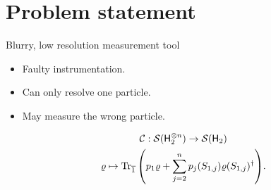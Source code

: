 \section{Problem statement}

\begin{frame}{Blurry, low resolution measurement tool}
    \begin{itemize}
        \item Faulty instrumentation.
        \item Can only resolve one particle.
        \item May measure the wrong particle.
    \end{itemize}
    \begin{gather}\label{eq:CG}
        \mathcal{C}:\mathcal{S}( {\sf H}_{2}^{\otimes n})\to \mathcal{S}({\sf H}_{2})\nonumber\\
        \varrho\mapsto\Tr_{\overline{1}}\qty(p_{1}\varrho+\sum_{j=2}^{n}p_{j}(S_{1,j})\varrho(S_{1,j})^{\dagger}).\nonumber
    \end{gather}
\end{frame}

